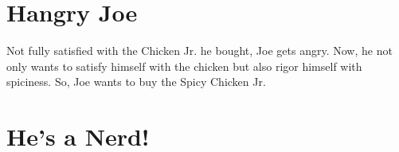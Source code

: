 
\setcounter{chapter}{2}
\chapter{Hangry Joe}
Not fully satisfied with the Chicken Jr. he bought, Joe gets angry.
 Now, he not only wants to satisfy himself with the chicken but also rigor himself with spiciness.
 So, Joe wants to buy the Spicy Chicken Jr.

\setcounter{chapter}{3}
\chapter{He's a Nerd!} %
